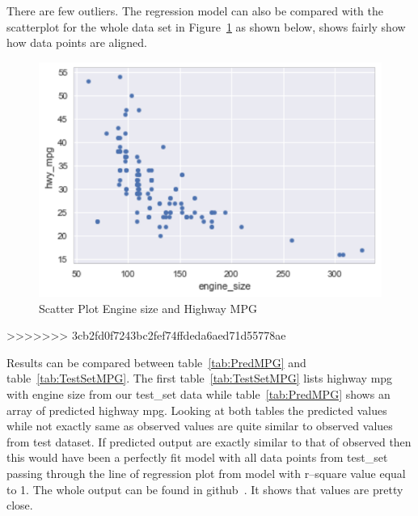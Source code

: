  
 There are few outliers. The regression model can also be compared with 
 the scatterplot for the whole data set
 in Figure~\ref{fig:scatterplt} as shown below, shows fairly show how data 
 points are aligned.
 
  \begin{figure}[h!]
  \includegraphics[scale=1.0]{images/scatterplot.pdf}
  \caption{Scatter Plot Engine size and Highway MPG}
\label{fig:scatterplt}
\end{figure} 
>>>>>>> 3cb2fd0f7243bc2fef74ffdeda6aed71d55778ae
 
Results can be compared between table~\ref{tab:PredMPG} and
table~\ref{tab:TestSetMPG}.  The first table~\ref{tab:TestSetMPG}
lists highway mpg with engine size from our test\_set data while
table~\ref{tab:PredMPG} shows an array of predicted highway mpg.
Looking at both tables the predicted values while not exactly same as
observed values are quite similar to observed values from test
dataset. If predicted output are exactly similar to that of observed
then this would have been a perfectly fit model with all data points
from test\_set passing through the line of regression plot from model
with r--square value equal to 1.  The whole output can be found in
github~\cite{hid-sp18-415-analysis}.  It shows that values are pretty
close.

